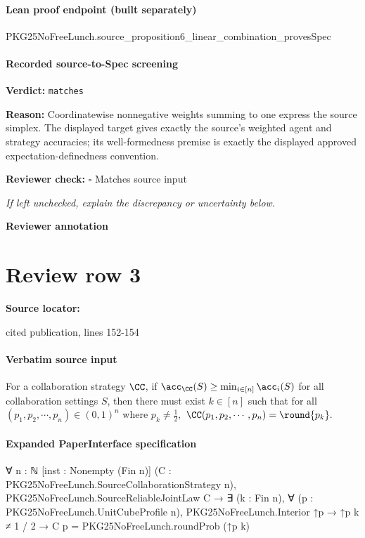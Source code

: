 \documentclass[10pt]{article}
\newcommand{\reviewerbox}{%
  \par\noindent\fbox{\parbox{0.96\linewidth}{\rule{0pt}{0.38in}}}\par
}
\newcommand{\reviewmatch}[1]{%
  \par\noindent\textbf{Reviewer check:} $\square$\; #1\par
  \noindent\emph{If left unchecked, explain the discrepancy or uncertainty below.}\par
}
\begin{document}
\paragraph{Lean proof endpoint (built separately)}\begin{ReviewVerbatim}
PKG25NoFreeLunch.source_proposition6_linear_combination_provesSpec
\end{ReviewVerbatim}

\paragraph{Recorded source-to-Spec screening}
\textbf{Verdict:} \texttt{matches}
\\
{\raggedright
\textbf{Reason:} Coordinatewise nonnegative weights summing to one express the source simplex.\allowbreak{} The displayed target gives exactly the source's weighted agent and strategy accuracies;\allowbreak{} its well-\allowbreak{}formedness premise is exactly the displayed approved expectation-\allowbreak{}definedness convention.\allowbreak{}
\par}
\reviewmatch{Matches source input}
\noindent\textbf{Reviewer annotation}\par
\reviewerbox
\clearpage
\hypertarget{source-claim-11915345567afada}{}
\section*{Review row 3}
\textbf{Source locator:} {\footnotesize\raggedright cited publication, lines 152-\allowbreak{}154\par}
\paragraph{Verbatim source input}
\begin{ReviewVerbatim}
\begin{proposition}\label{prop:part1}
    For a collaboration strategy $\CC$, if $\acc_\CC(S)\ge \min_{i\in [n]}\acc_i(S)$ for all collaboration settings $S$, then there must exist $k\in [n]$ such that for all $(p_1,p_2,\cdots,p_n)\in (0,1)^n$ where $p_k\neq \frac{1}{2},$ $\CC(p_1,p_2,\cdots,p_n)=\round{p_k}.$
\end{proposition}
\end{ReviewVerbatim}



\paragraph{Expanded PaperInterface specification}
\begin{ReviewVerbatim}
∀ {n : ℕ} [inst : Nonempty (Fin n)] (C : PKG25NoFreeLunch.SourceCollaborationStrategy n),
  PKG25NoFreeLunch.SourceReliableJointLaw C →
    ∃ (k : Fin n),
      ∀ (p : PKG25NoFreeLunch.UnitCubeProfile n),
        PKG25NoFreeLunch.Interior ↑p → ↑p k ≠ 1 / 2 → C p = PKG25NoFreeLunch.roundProb (↑p k)
\end{ReviewVerbatim}
\end{document}
